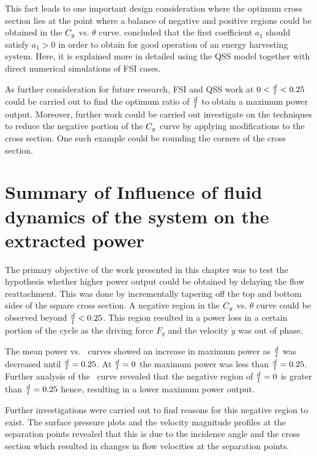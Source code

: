 This fact leads to one important design consideration where the optimum cross section lies at the point where a balance of negative and positive regions could be obtained in the $C_{y}$ vs. $\theta$ curve. \citet{Barrero-Gil2010a} concluded that the first coefficient $a_1$ should satisfy  $a_1>0$ in order to obtain for good operation of an energy harvesting system. Here, it is explained more in detailed using the QSS model together with direct numerical simulations of FSI cases. 

As further consideration for future research, FSI and QSS work at $0<\frac{d}{l}<0.25$ could be carried out to find the optimum ratio of $\frac{d}{l}$ to obtain a maximum power output. Moreover, further work could be carried out investigate on the techniques to reduce the negative portion of the $C_{y}$ curve by applying modifications to the cross section. One such example could be rounding the corners of the cross section.

\section{Summary of Influence of fluid dynamics of the system on the extracted power} 
\label{sec:summary-diff-cross-sec}

The primary objective of the work presented in this chapter was to test the hypothesis whether higher power output could be obtained by delaying the flow reattachment. This was done by incrementally tapering off the top and bottom sides of the square cross section. A negative region in the $C_{y}$ vs. $\theta$ curve could be observed beyond $\frac{d}{l}<0.25$. This region resulted in a power loss in a certain portion of the cycle as the driving force $F_y$ and the velocity $\dot{y}$ was out of phase.

The mean power vs. \massdamp\ curves showed an increase in maximum power as $\frac{d}{l}$ was decreased until $\frac{d}{l}=0.25$. At $\frac{d}{l}=0$ the maximum power was less than $\frac{d}{l}=0.25$. Further analysis of the \cy\ curve revealed that the negative region of $\frac{d}{l}=0$ is grater than $\frac{d}{l}=0.25$ hence, resulting in a lower maximum power output. 

Further investigations were carried out to find reasons for this negative region to exist. The surface pressure plots and the velocity magnitude profiles at the separation points revealed that this is due to the incidence angle and the cross section which resulted in changes in flow velocities at the separation points. 

